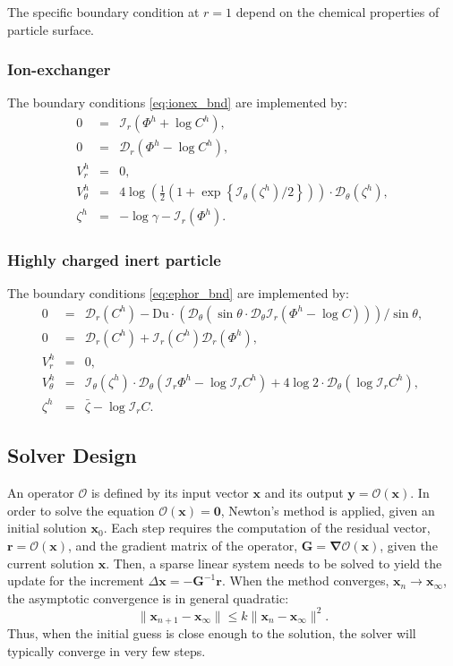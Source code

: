 \documentclass[10pt]{ijnam}
\newcommand{\pars}[1]{\left(#1\right)}
\newcommand\bnabla{\boldsymbol{\nabla}}
\newcommand\bG{\boldsymbol{G}}
\newcommand\bx{\boldsymbol{x}}
\newcommand\by{\boldsymbol{y}}
\newcommand\br{\boldsymbol{r}}
\newcommand\bzero{\boldsymbol{0}}
\newcommand\cO{\mathcal{O}}
\newcommand\cI{\mathcal{I}}
\newcommand\cD{\mathcal{D}}
\begin{document}
The specific boundary condition at $r=1$
depend on the chemical properties of particle surface.

\subsubsection{Ion-exchanger} The boundary conditions \eqref{eq:ionex_bnd} 
are implemented by:
\begin{equation}
\begin{array}{rcl}
0 &=& \cI_r(\varPhi^h + \log C^h), \\
0 &=& \cD_r(\varPhi^h - \log C^h), \\
V^h_r &=& 0, \\
V^h_\theta &=& 4\log\pars{\frac{1}{2}\pars{1 + \exp\left\{\cI_\theta(\zeta^h)/2\right\}}} \cdot 
			\cD_\theta(\zeta^h), \\
  \zeta^h &=& - \log \gamma - \cI_r(\varPhi^h).
\end{array}
\end{equation}

\subsubsection{Highly charged inert particle} The boundary conditions \eqref{eq:ephor_bnd} 
are implemented by:
\begin{equation}
\begin{array}{rcl}
0 &=& \cD_r(C^h) - \text{Du} \cdot 
\pars{\cD_\theta \pars{\sin\theta \cdot \cD_\theta \cI_r\pars{\varPhi^h - \log C}}}/{\sin\theta}, \\
0 &=& \cD_r(C^h) + \cI_r(C^h) \cD_r(\varPhi^h), \\
V^h_r &=& 0, \\
V^h_\theta &=& \cI_\theta(\zeta^h) \cdot \cD_\theta(\cI_r \varPhi^h - \log \cI_r C^h) + 
4 \log 2 \cdot \cD_\theta(\log \cI_r C^h), \\
  \zeta^h &=& \bar{\zeta} - \log \cI_r C.
\end{array}
\end{equation}

\subsection{Solver Design}
An operator $\cO$ is defined by its input vector $\bx$ and its output 
$\by = \cO(\bx)$.
In order to solve the equation $\cO(\bx) = \bzero$, Newton's method is applied, 
given an initial solution $\bx_0$.
Each step requires the computation of the residual vector, $\br = \cO(\bx)$, and
the gradient matrix of the operator, $\bG = \bnabla \cO(\bx)$, 
given the current solution $\bx$.
Then, a sparse linear system needs to be solved to yield the update for the 
increment $\Delta \bx = -\bG^{-1} \br$.
When the method converges, $\bx_n \rightarrow \bx_\infty$, 
the asymptotic convergence is in general quadratic:
\begin{equation}
\|\bx_{n+1} - \bx_\infty\| \le k \|\bx_{n} - \bx_\infty\|^2.
\end{equation}
Thus, when the initial guess is close enough to the solution, the solver
will typically converge in very few steps.
\end{document}
